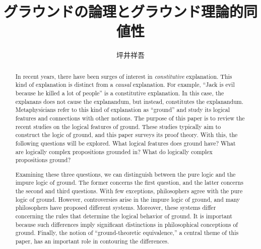 \documentclass[twoside,14Q,dvipdfmx]{jsarticle}
\title{グラウンドの論理とグラウンド理論的同値性%
}
\author{坪井祥吾}
\date{}
\theoremstyle{definition}
\begin{document}
\maketitle


\begin{abstract}
In recent years, there have been surges of interest in \emph{constitutive} explanation. This kind of explanation is distinct from a \emph{causal} explanation. For example, ``Jack is evil because he killed a lot of people'' is a constitutive explanation. In this case, the explanans does not cause the explanandum, but instead, constitutes the explanandum. Metaphysicians refer to this kind of explanation as ``ground'' and study its logical features and connections with other notions.  The purpose of this paper is to review the recent studies on the logical features of ground. These studies typically aim to construct the logic of ground, and this paper surveys its proof theory. With this, the following questions will be explored. What logical features does ground have? What are logically complex propositions grounded in? What do logically complex propositions ground? 

Examining these three questions, we can distinguish between the pure logic and the impure logic of ground. The former concerns the first question, and the latter concerns the second and third questions. With few exceptions, philosophers agree with the pure logic of ground. However, controversies arise in the impure logic of ground, and many philosophers have proposed different systems. Moreover, these systems differ concerning the rules that determine the logical behavior of ground. It is important because such differences imply significant distinctions in philosophical conceptions of ground. Finally, the notion of ``ground-theoretic equivalence,'' a central theme of this paper, has an important role in contouring the differences.
\\

{}
\end{abstract}
\end{document}
